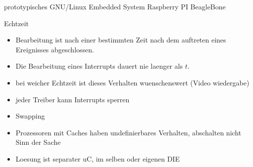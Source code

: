 \begin{frame}{prototypisches GNU/Linux Embedded System}
	Raspberry PI
	BeagleBone
\end{frame}

\begin{frame}{Echtzeit}
	\begin{itemize}
		\item Bearbeitung ist nach einer bestimmten Zeit nach dem auftreten eines Ereignisses abgeschlossen.
		\item Die Bearbeitung eines Interrupts dauert nie laenger als $t$.
		\item bei weicher Echtzeit ist dieses Verhalten wuenschenswert (Video wiedergabe)
		\item jeder Treiber kann Interrupts sperren
		\item Swapping
		\item Prozessoren mit Caches haben undefinierbares Verhalten, abschalten nicht Sinn der Sache
		\item Loesung ist separater uC, im selben oder eigenen DIE
	\end{itemize}
\end{frame}


